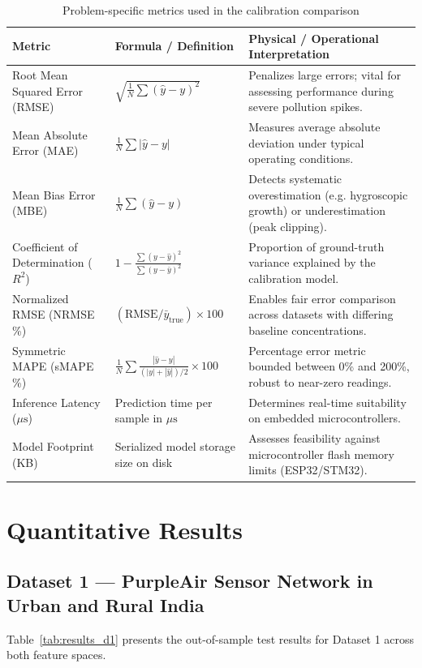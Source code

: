 \documentclass[11pt,a4paper]{article}
\begin{document}
\begin{table}[htbp]
\centering
\small
\caption{Problem-specific metrics used in the calibration comparison}
\label{tab:metrics}
\begin{tabularx}{\textwidth}{l X X}
\toprule
\textbf{Metric} & \textbf{Formula / Definition} & \textbf{Physical / Operational Interpretation} \\
\midrule
Root Mean Squared Error (RMSE) & $\sqrt{\frac{1}{N} \sum (\hat{y} - y)^2}$ & Penalizes large errors; vital for assessing performance during severe pollution spikes. \\
Mean Absolute Error (MAE) & $\frac{1}{N} \sum |\hat{y} - y|$ & Measures average absolute deviation under typical operating conditions. \\
Mean Bias Error (MBE) & $\frac{1}{N} \sum (\hat{y} - y)$ & Detects systematic overestimation (e.g. hygroscopic growth) or underestimation (peak clipping). \\
Coefficient of Determination ($R^2$) & $1 - \frac{\sum (y - \hat{y})^2}{\sum (y - \bar{y})^2}$ & Proportion of ground-truth variance explained by the calibration model. \\
Normalized RMSE (NRMSE \%) & $(\text{RMSE} / \bar{y}_{\text{true}}) \times 100$ & Enables fair error comparison across datasets with differing baseline concentrations. \\
Symmetric MAPE (sMAPE \%) & $\frac{1}{N} \sum \frac{|\hat{y} - y|}{(|y| + |\hat{y}|)/2} \times 100$ & Percentage error metric bounded between 0\% and 200\%, robust to near-zero readings. \\
Inference Latency ($\mu\text{s}$) & Prediction time per sample in $\mu\text{s}$ & Determines real-time suitability on embedded microcontrollers. \\
Model Footprint (KB) & Serialized model storage size on disk & Assesses feasibility against microcontroller flash memory limits (ESP32/STM32). \\
\bottomrule
\end{tabularx}
\end{table}

\section{Quantitative Results}

\subsection{Dataset 1 --- PurpleAir Sensor Network in Urban and Rural India}
Table~\ref{tab:results_d1} presents the out-of-sample test results for Dataset 1 across both feature spaces.
\end{document}
